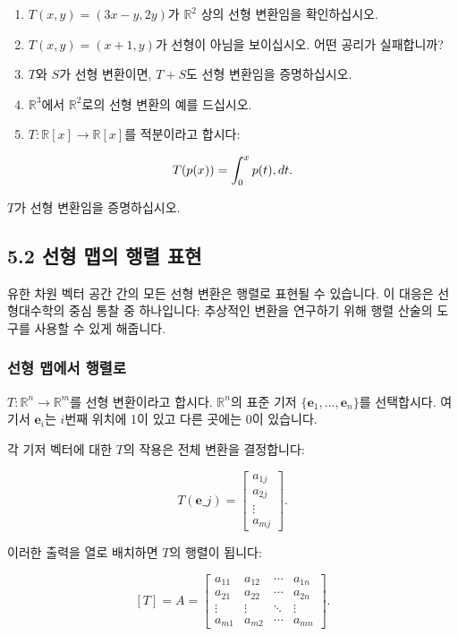 \documentclass[
  12pt,
  a4paper,
]{article}
\begin{document}
\begin{enumerate}
\def\labelenumi{\arabic{enumi}.}
\item
  \(T(x,y) = (3x-y, 2y)\)가 \(\mathbb{R}^2\) 상의 선형 변환임을 확인하십시오.
\item
  \(T(x,y) = (x+1, y)\)가 선형이 아님을 보이십시오. 어떤 공리가 실패합니까?
\item
  \(T\)와 \(S\)가 선형 변환이면, \(T+S\)도 선형 변환임을 증명하십시오.
\item
  \(\mathbb{R}^3\)에서 \(\mathbb{R}^2\)로의 선형 변환의 예를 드십시오.
\item
  \(T:\mathbb{R}[x] \to \mathbb{R}[x]\)를 적분이라고 합시다:
\end{enumerate}

\[T(p(x)) = \int_0^x p(t)\\,dt.\]

\(T\)가 선형 변환임을 증명하십시오.

\subsection{5.2 선형 맵의 행렬 표현}\label{52-matrix-representation-of-linear-maps}

유한 차원 벡터 공간 간의 모든 선형 변환은 행렬로 표현될 수 있습니다. 이 대응은 선형대수학의 중심 통찰 중 하나입니다: 추상적인 변환을 연구하기 위해 행렬 산술의 도구를 사용할 수 있게 해줍니다.

\subsubsection{선형 맵에서 행렬로}\label{from-linear-map-to-matrix}

\(T: \mathbb{R}^n \to \mathbb{R}^m\)를 선형 변환이라고 합시다. \(\mathbb{R}^n\)의 표준 기저 \(\{ \mathbf{e}_1, \dots, \mathbf{e}_n \}\)를 선택합시다. 여기서 \(\mathbf{e}_i\)는 \(i\)번째 위치에 1이 있고 다른 곳에는 0이 있습니다.

각 기저 벡터에 대한 \(T\)의 작용은 전체 변환을 결정합니다:

\[T(\mathbf{e}\_j) = \begin{bmatrix}
a_{1j} \\
a_{2j} \\
\vdots \\
a_{mj} \end{bmatrix}.\]

이러한 출력을 열로 배치하면 \(T\)의 행렬이 됩니다:

\[[T] = A = \begin{bmatrix}
a_{11} & a_{12} & \cdots & a_{1n} \\
a_{21} & a_{22} & \cdots & a_{2n} \\
\vdots & \vdots & \ddots & \vdots \\
a_{m1} & a_{m2} & \cdots & a_{mn}
\end{bmatrix}.\]
\end{document}

